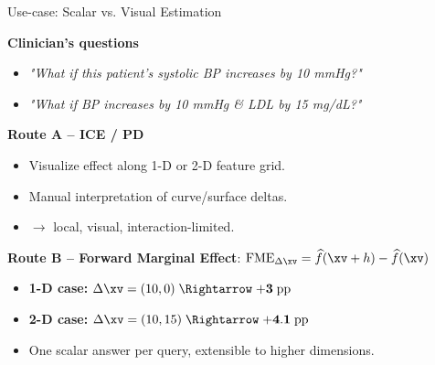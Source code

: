 \documentclass[11pt,compress,t,notes=noshow, aspectratio=169, xcolor=table]{beamer}
\begin{document}
\begin{frame}{Use-case: Scalar vs. Visual Estimation}

\textbf{Clinician’s questions}
\begin{itemize}\setlength\itemsep{0.3em}
  \item \emph{"What if this patient’s systolic BP increases by 10 mmHg?"}
  \item \emph{"What if BP increases by 10 mmHg \& LDL by 15 mg/dL?"}
\end{itemize}

\vspace{0.5em}
\textbf{Route A – ICE / PD}
\begin{itemize}
  \item Visualize effect along 1-D or 2-D feature grid.
  \item Manual interpretation of curve/surface deltas.
  \item \(\rightarrow\) local, visual, interaction-limited.
\end{itemize}

\vspace{0.3em}
\textbf{Route B – Forward Marginal Effect}: $\mathrm{FME}_{\Delta\xv}
  = \widehat f(\xv + h) - \widehat f(\xv)$
\begin{itemize}
  \item \textbf{1-D case:} \(\Delta\xv = (10, 0) \;\Rightarrow\; \mathbf{+3\;\text{pp}}\)
  \item \textbf{2-D case:} \(\Delta\xv = (10, 15) \;\Rightarrow\; \mathbf{+4.1\;\text{pp}}\)
  \item One scalar answer per query, extensible to higher dimensions.
\end{itemize}

\end{frame}



\end{document}
